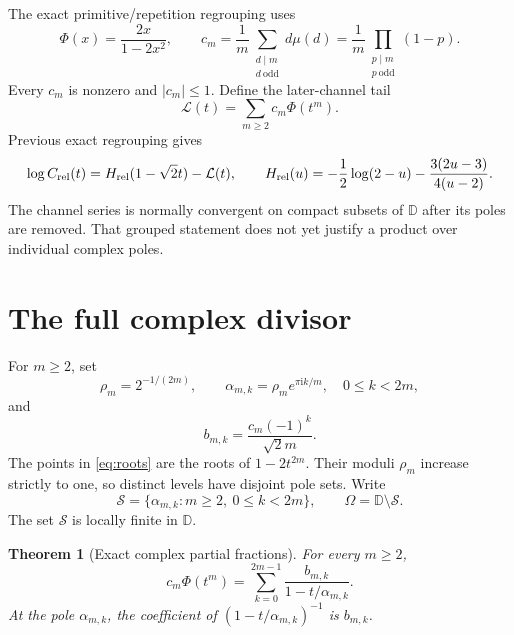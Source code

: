 \documentclass[11pt]{article}
\newtheorem{theorem}{Theorem}[section]
\newcommand{\D}{\mathbb D}
\newcommand{\Crel}{C_{\rm rel}}
\newcommand{\Lm}{\mathcal L}
\newcommand{\ii}{\mathrm i}
\begin{document}
The exact primitive/repetition regrouping uses
\begin{equation}\label{eq:phi-c}
 \Phi(x)=\frac{2x}{1-2x^2},\qquad
 c_m=\frac1m\sum_{\substack{d\mid m\\d\ \mathrm{odd}}}d\mu(d)
     =\frac1m\prod_{\substack{p\mid m\\p\ \mathrm{odd}}}(1-p).
\end{equation}
Every $c_m$ is nonzero and $|c_m|\le1$.  Define the later-channel tail
\begin{equation}\label{eq:tail}
 \Lm(t)=\sum_{m\ge2}c_m\Phi(t^m).
\end{equation}
Previous exact regrouping gives
\begin{equation}\label{eq:previous-cont}
 \log\Crel(t)=H_{\rm rel}(1-\sqrt2t)-\Lm(t),
 \qquad
 H_{\rm rel}(u)=-\frac12\log(2-u)
 -\frac{3(2u-3)}{4(u-2)}.
\end{equation}
The channel series is normally convergent on compact subsets of $\D$ after
its poles are removed.  That grouped statement does not yet justify a
product over individual complex poles.

\section{The full complex divisor}

For $m\ge2$, set
\begin{equation}\label{eq:roots}
 \rho_m=2^{-1/(2m)},\qquad
 \alpha_{m,k}=\rho_m e^{\pi\ii k/m},\quad 0\le k<2m,
\end{equation}
and
\begin{equation}\label{eq:bmk}
 b_{m,k}=\frac{c_m(-1)^k}{\sqrt2m}.
\end{equation}
The points in \eqref{eq:roots} are the roots of $1-2t^{2m}$.  Their moduli
$\rho_m$ increase strictly to one, so distinct levels have disjoint pole
sets.  Write
\begin{equation}\label{eq:singular-set}
 \mathcal S=\{\alpha_{m,k}:m\ge2,\ 0\le k<2m\},\qquad
 \Omega=\D\setminus\mathcal S.
\end{equation}
The set $\mathcal S$ is locally finite in $\D$.

\begin{theorem}[Exact complex partial fractions]\label{thm:partial}
For every $m\ge2$,
\begin{equation}\label{eq:partial}
 c_m\Phi(t^m)=\sum_{k=0}^{2m-1}
 \frac{b_{m,k}}{1-t/\alpha_{m,k}}.
\end{equation}
At the pole $\alpha_{m,k}$, the coefficient of
$(1-t/\alpha_{m,k})^{-1}$ is $b_{m,k}$.
\end{theorem}
\end{document}
